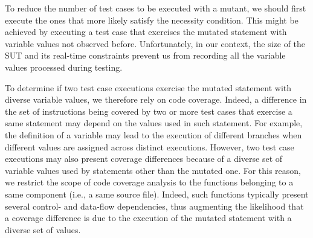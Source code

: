 
To reduce the number of test cases to be executed with a mutant, 
we should first execute the ones that more likely satisfy the necessity condition. 
This might be achieved by executing a test case that exercises the mutated statement with variable values not observed before. 
Unfortunately, in our context, the size of the SUT and its real-time constraints prevent us from recording all the variable values processed during testing. 

To determine if two test case executions exercise the mutated statement with diverse variable values, we therefore rely on code coverage.
Indeed, a difference in the set of instructions being covered by two or more test cases that exercise a same statement may depend on the values used in such statement. For example, the definition of a variable may lead to the execution of different branches when different values are assigned across distinct executions.
However, two test case executions may also present coverage differences 
because of a diverse set of variable values used by statements other than the mutated one. 
For this reason, we restrict the scope of code coverage analysis 
to the functions belonging to a same component (i.e., a same source file).
Indeed, such functions typically present several control- and data-flow dependencies, thus 
augmenting the likelihood that a coverage difference is due to the execution of the mutated statement with a diverse set of values.

